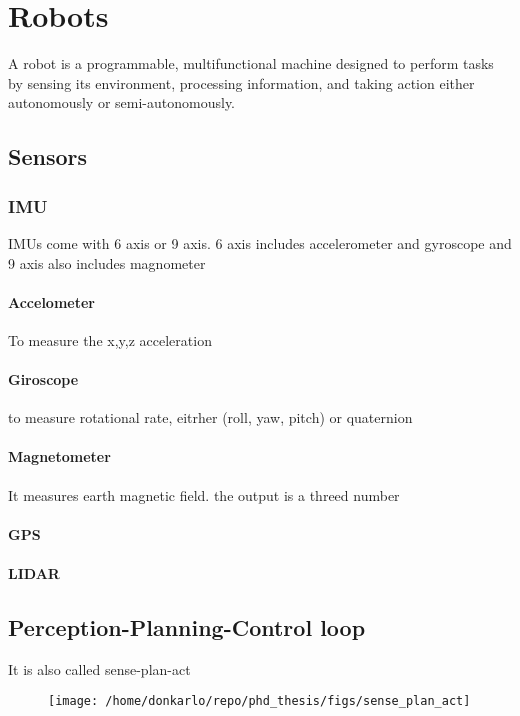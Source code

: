 \chapter{Robots}
A robot is a programmable, multifunctional machine designed to perform tasks by sensing its environment, processing information, and taking action either autonomously or semi-autonomously.



\section{Sensors}
    \subsection{IMU}
        IMUs come with 6 axis or 9 axis. 6 axis includes accelerometer and gyroscope and 9 axis also includes magnometer
        
        \subsubsection{Accelometer}
            To measure the x,y,z acceleration
        
        \subsubsection{Giroscope}
            to measure rotational rate, eitrher (roll, yaw, pitch) or quaternion
        
        \subsubsection{Magnetometer}
            It measures earth magnetic field. the output is a threed number
        
        \subsubsection{GPS}
        
        \subsubsection{LIDAR}
        
\section{Perception-Planning-Control loop}
    It is also called sense-plan-act
    \begin{figure}[H]
        \centering
        \texttt{[image: /home/donkarlo/repo/phd\_thesis/figs/sense\_plan\_act]}
        \label{fig:my_png}
    \end{figure}
    
